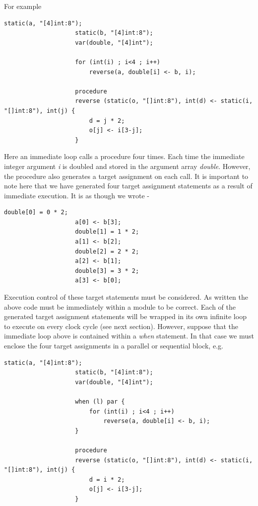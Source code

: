                 For example
                \begin{lstlisting}[gobble=16, language=threepl]
                    static(a, "[4]int:8");
                    static(b, "[4]int:8");
                    var(double, "[4]int");

                    for (int(i) ; i<4 ; i++)
                        reverse(a, double[i] <- b, i);

                    procedure
                    reverse (static(o, "[]int:8"), int(d) <- static(i, "[]int:8"), int(j) {
                        d = j * 2;
                        o[j] <- i[3-j];
                    }
                \end{lstlisting}
                Here an immediate loop calls a procedure four times. Each time
                the immediate integer argument {\em i} is doubled and stored in
                the argument array {\em double}. However, the procedure also
                generates a target assignment on each call. It is important to
                note here that we have generated four target assignment
                statements as a result of immediate execution. It is as though
                we wrote -
                \begin{lstlisting}[gobble=16, language=threepl]
                    double[0] = 0 * 2;
                    a[0] <- b[3];
                    double[1] = 1 * 2;
                    a[1] <- b[2];
                    double[2] = 2 * 2;
                    a[2] <- b[1];
                    double[3] = 3 * 2;
                    a[3] <- b[0];
                \end{lstlisting}
                Execution control of these target statements must be considered.
                As written the above code must be immediately within a module to
                be correct. Each of the generated target assignment statements
                will be wrapped in its own infinite loop to execute on every
                clock cycle (see next section). However, suppose that the
                immediate loop above is contained within a {\em when} statement.
                In that case we must enclose the four target assignments in a
                parallel or sequential block, e.g.
                \begin{lstlisting}[gobble=16, language=threepl]
                    static(a, "[4]int:8");
                    static(b, "[4]int:8");
                    var(double, "[4]int");

                    when (l) par {
                        for (int(i) ; i<4 ; i++)
                            reverse(a, double[i] <- b, i);
                    }

                    procedure
                    reverse (static(o, "[]int:8"), int(d) <- static(i, "[]int:8"), int(j) {
                        d = i * 2;
                        o[j] <- i[3-j];
                    }
                \end{lstlisting}
